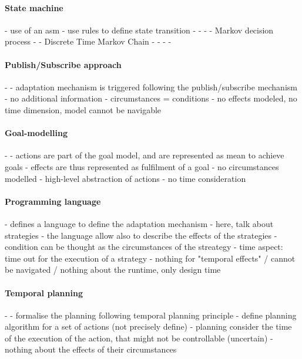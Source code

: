 \paragraph{State machine}
- \cite{DBLP:conf/icse/ArcainiRS15} use of an \gls{asm}
	- use rules to define state transition
- \cite{DBLP:conf/icse/IftikharW14a}
- \cite{DBLP:conf/smartgridsec/0001FKNT14}
- \cite{DBLP:conf/sigsoft/MorenoCGS15}
	- Markov decision process
- \cite{DBLP:conf/kbse/FilieriGLM11}
	- Discrete Time Markov Chain
- \cite{DBLP:conf/wetice/DjoudiBZ14}
- \cite{DBLP:conf/aosd/ZhangGC09}
- \cite{DBLP:conf/icse/GhezziPST13}
- \cite{DBLP:conf/kbse/TajalliGEM10}
		 
\paragraph{Publish/Subscribe approach}
- \cite{DBLP:conf/icse/BarbosaLMJ17}
	- adaptation mechanism is triggered following the publish/subscribe mechanism
	- no additional information
	- circumstances = conditions
	- no effects modeled, no time dimension, model cannot be navigable
	
\paragraph{Goal-modelling}
- \cite{DBLP:conf/icse/MendoncaAR14, DBLP:conf/iceccs/BencomoWSW12}
	- actions are part of the goal model, and are represented as mean to achieve goals
	- effects are thus represented as fulfilment of a goal
	- no circumstances modelled
	- high-level abstraction of actions
	- no time consideration
	
\paragraph{Programming language}
- \cite{DBLP:journals/jss/ChengG12} defines a language to define the adaptation mechanism
	- here, talk about strategies
	- the language allow also to describe the effects of the strategies 
	- condition can be thought as the circumstances of the streategy
	- time aspect: time out for the execution of a strategy
	- nothing for "temporal effects" / cannot be navigated / nothing about the runtime, only design time
	
\paragraph{Temporal planning}
- \cite{DBLP:conf/aaai/CimattiMR15}
	- formalise the planning following temporal planning principle
	- define planning algorithm for a set of actions (not precisely define)
	- planning consider the time of the execution of the action, that might not be controllable (uncertain)
	- nothing about the effects of their circumstances
	 
